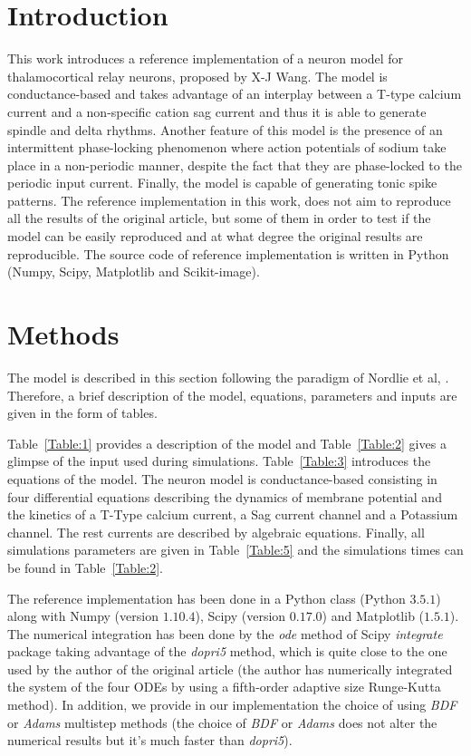 \documentclass[10pt,a4paper,onecolumn]{article}
\begin{document}
\section{Introduction}\label{introduction}

This work introduces a reference implementation of a neuron model 
for thalamocortical relay neurons, \cite{wang:1994} proposed by X-J Wang.
The model is conductance-based and takes advantage of an interplay between 
a T-type calcium current and a non-specific cation sag current and thus it
is able to generate spindle and delta rhythms. Another feature of this model
is the presence of an intermittent phase-locking phenomenon
where action potentials of sodium take place in a non-periodic manner, despite
the fact that they are phase-locked to the periodic input current. Finally,
the model is capable of generating tonic spike patterns. The reference 
implementation in this work, does not aim to reproduce all the results of 
the original article, but some of them in order to test if the model can be
easily reproduced and at what degree the original results are reproducible.
The source code of reference implementation is written in Python (Numpy,
Scipy, Matplotlib and Scikit-image). 


\section{Methods}\label{methods}

The model is described in this section following the paradigm of 
Nordlie et al, \cite{nordlie:2009}. Therefore, a brief description of
the model, equations, parameters and inputs are given in the form of 
tables. 

Table~\ref{Table:1} provides a description of the model and Table~\ref{Table:2}
gives a glimpse of the input used during simulations. Table~\ref{Table:3}
introduces the equations of the model. The neuron model is conductance-based
consisting in four differential equations describing the dynamics of membrane
potential and the kinetics of a T-Type calcium current, a Sag current channel
and a Potassium channel. The rest currents are described by algebraic
equations. Finally, all simulations parameters are given in
Table~\ref{Table:5} and the simulations times can be found in
Table~\ref{Table:2}.

The reference implementation has been done in a Python class (Python $3.5.1$)
along with Numpy (version $1.10.4$), Scipy (version $0.17.0$) and Matplotlib
($1.5.1$). The numerical integration has been done by the \emph{ode} method 
of Scipy \emph{integrate} package taking advantage of the \emph{dopri5} 
method, which is quite close to the one used by the author of the original 
article (the author has numerically integrated the system of the four ODEs
by using a fifth-order adaptive size Runge-Kutta method). In addition, we 
provide in our implementation the choice of using \emph{BDF} or \emph{Adams}
multistep methods \cite{ascher:1998} (the choice of \emph{BDF} or \emph{Adams}
does not alter the numerical results but it's much faster than \emph{dopri5}).
\end{document}
